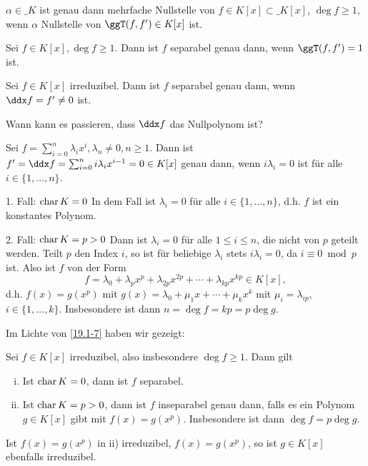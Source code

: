 \begin{kor} \label{19.1-5}
	$\alpha \in \_K$ ist genau dann mehrfache Nullstelle von $f \in K[x] \subset \_K[x]$, $\deg f \ge 1$, wenn $\alpha$ Nullstelle von $\ggT(f, f') \in K[x]$ ist.
\end{kor}

\begin{kor} \label{19.1-6}
	Sei $f \in K[x], \deg f \ge 1$.
	Dann ist $f$ separabel genau dann, wenn $\ggT(f, f') = 1$ ist.
\end{kor}

\begin{kor} \label{19.1-7}
	Sei $f \in K[x]$ irreduzibel.
	Dann ist $f$ separabel genau dann, wenn $\ddx f = f' \neq 0$ ist.
\end{kor}

Wann kann es passieren, dass $\ddx f$ das Nullpolynom ist?

Sei $f = \sum_{i=0}^n \lambda_i x^i, \lambda_n \neq 0, n \ge 1$.
Dann ist $f' = \ddx f = \sum_{i=0}^n i \lambda_i x^{i-1} = 0 \in K[x]$ genau dann, wenn $i \lambda_i = 0$ ist für alle $i \in \{1, \dotsc, n\}$.
\begin{seg}{1. Fall: $\operatorname{char} K = 0$}
	In dem Fall ist $\lambda_i = 0$ für alle $i \in \{1, \dotsc, n\}$, d.h. $f$ ist ein konstantes Polynom.
\end{seg}
\begin{seg}{2. Fall: $\operatorname{char} K = p > 0$}
	Dann ist $\lambda_i = 0$ für alle $1 \le i \le n$, die nicht von $p$ geteilt werden.
	Teilt $p$ den Index $i$, so ist für beliebige $\lambda_i$ stets $i \lambda_i = 0$, da $i \equiv 0 \bmod p$ ist.
	Also ist $f$ von der Form
	\[
		f = \lambda_0 + \lambda_p x^p + \lambda_{2p} x^{2p} + \dotsb + \lambda_{kp} x^{kp} \in K[x],
	\]
	d.h. $f(x) = g(x^p)$ mit $g(x) = \lambda_0 + \mu_1 x + \dotsb + \mu_k x^k$ mit $\mu_i = \lambda_{ip}$, $i \in \{1, \dotsc, k\}$.
	Insbesondere ist dann $n = \deg f = kp = p \deg g$.
\end{seg}

Im Lichte von \ref{19.1-7} haben wir gezeigt:

\begin{st} \label{19.1-8}
	Sei $f \in K[x]$ irreduzibel, also insbesondere $\deg f \ge 1$.
	Dann gilt
	\begin{enumerate}[i)]
		\item
			Ist $\operatorname{char} K = 0$, dann ist $f$ separabel.
		\item
			Ist $\operatorname{char} K = p > 0$, dann ist $f$ inseparabel genau dann, falls es ein Polynom $g \in K[x]$ gibt mit $f(x) = g(x^p)$.
			Insbesondere ist dann $\deg f = p \deg g$.
	\end{enumerate}
	Ist $f(x) = g(x^p)$ in ii) irreduzibel, $f(x) = g(x^p)$, so ist $g \in K[x]$ ebenfalls irreduzibel.
\end{st}


